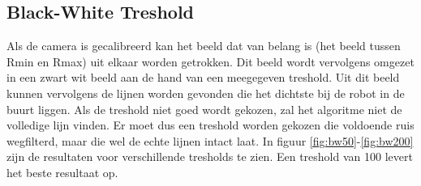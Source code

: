 \documentclass[a4paper]{article}
\begin{document}
\subsection{Black-White Treshold}
Als de camera is gecalibreerd kan het beeld dat van belang is (het beeld tussen Rmin en Rmax) uit elkaar worden getrokken. Dit beeld wordt vervolgens omgezet in een zwart wit beeld aan de hand van een meegegeven treshold. Uit dit beeld kunnen vervolgens de lijnen worden gevonden die het dichtste bij de robot in de buurt liggen. Als de treshold niet goed wordt gekozen, zal het algoritme niet de volledige lijn vinden. Er moet dus een treshold worden gekozen die voldoende ruis wegfilterd, maar die wel de echte lijnen intact laat. In figuur \ref{fig:bw50}-\ref{fig:bw200} zijn de resultaten voor verschillende tresholds te zien. Een treshold van 100 levert het beste resultaat op.
\end{document}
